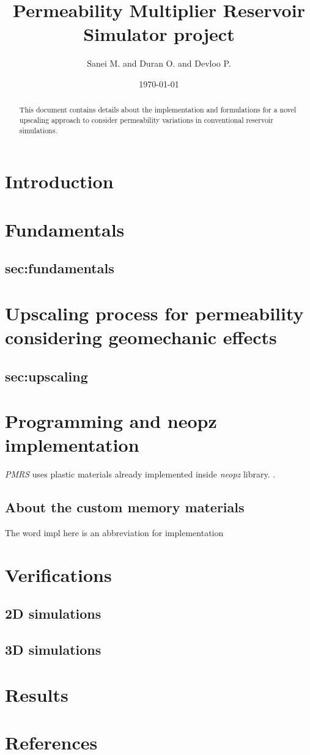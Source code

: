 \documentclass[a4paper]{article}
\title{Permeability Multiplier Reservoir Simulator \PMRS project}
\author{Sanei M. and Duran O. and Devloo P.}
\date{\today}
\newcommand{\PMRS}{\textit{PMRS }}
\newcommand{\neopz}{\textit{neopz }}
\begin{document}
\maketitle

\begin{abstract}
This document contains details about the implementation and formulations for a novel upscaling approach to consider permeability variations in conventional reservoir simulations.
\end{abstract}

\section{Introduction}
\label{sec:introduction}

\section{Fundamentals}
\subsection{sec:fundamentals}

\section{Upscaling process for permeability considering geomechanic effects}
\subsection{sec:upscaling}

\section{Programming and neopz implementation}
\label{sec:programmaing}

\PMRS uses plastic materials already implemented inside \neopz library.  
\cite{SouzaNeto2008}.

\subsection{About the custom memory materials}


The word impl here is an abbreviation for implementation

\section{Verifications}

\subsection{2D simulations}

\subsection{3D simulations}

\section{Results}

\section{References}
\printbibliography
\end{document}
